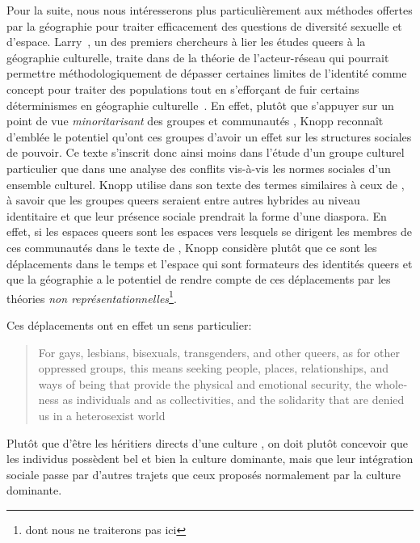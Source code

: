 Pour la suite, nous nous intéresserons plus particulièrement aux méthodes offertes par la géographie pour traiter efficacement des questions de diversité sexuelle et d'espace. 
Larry~\citet{Knopp2004}, un des premiers chercheurs à lier les études queers à la géographie culturelle, traite dans  de la théorie de l'acteur-réseau qui pourrait permettre méthodologiquement de dépasser certaines limites de l'identité comme concept pour traiter des populations \lgbt{} tout en s’efforçant de fuir certains déterminismes en géographie culturelle~\citep{Knopp2004}. 
En effet, plutôt que s'appuyer sur un point de vue \emph{minoritarisant} des groupes et communautés \lgbt{}, Knopp reconnaît d'emblée le potentiel qu'ont ces groupes d'avoir un effet sur les structures sociales de pouvoir. 
Ce texte s'inscrit donc ainsi moins dans l'étude d'un groupe culturel particulier que dans une analyse des conflits vis-à-vis les normes sociales d'un ensemble culturel. 
Knopp utilise dans son texte des termes similaires à ceux de \citet{Sinfield1996}, à savoir que les groupes queers seraient entre autres hybrides au niveau identitaire et que leur présence sociale prendrait la forme d'une diaspora. 
En effet, si les espaces queers sont les espaces vers lesquels se dirigent les membres de ces communautés dans le texte de \citet{Sinfield1996}, Knopp considère plutôt que ce sont les déplacements dans le temps et l'espace qui sont formateurs des identités queers et que la géographie a le potentiel de rendre compte de ces déplacements par les théories \emph{non représentationnelles}\footnote{dont nous ne traiterons pas ici}.

Ces déplacements ont en effet un sens particulier: \foreignblockquote{english}[{\cite[123]{Knopp2004}}][.]{For gays, lesbians, bisexuals, transgenders, and other queers, as for other oppressed groups, this means seeking people, places, relationships, and ways of being that provide the physical and emotional security, the wholeness as individuals and as collectivities, and the solidarity that are denied us in a heterosexist world}
Plutôt que d'être les héritiers directs d'une culture \qu{}, on doit plutôt concevoir que les individus \qus{} possèdent bel et bien la culture dominante, mais que leur intégration sociale passe par d'autres trajets que ceux proposés normalement par la culture dominante.

